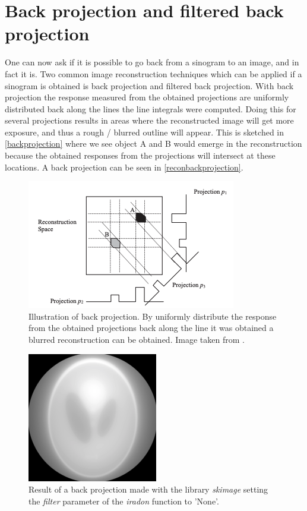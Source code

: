 \section{Back projection and filtered back projection}
One can now ask if it is possible to go back from a sinogram to an image, and in fact it is. Two common image reconstruction techniques which can be applied if a sinogram is obtained is back projection and filtered back projection. With back projection the response measured from the obtained projections are uniformly distributed back along the lines the line integrals were computed. Doing this for several projections results in areas where the reconstructed image will get more exposure, and thus a rough / blurred outline will appear. This is sketched in \autoref{backprojection} where we see object A and B would emerge in the reconstruction because the obtained responses from the projections will intersect at these locations. A back projection can be seen in \autoref{reconbackprojection}.\\
\begin{figure}
	\centering
	\includegraphics[width=0.9\linewidth]{Materials/backprojection}
	\caption{Illustration of back projection. By uniformly distribute the response from the obtained projections back along the line it was obtained a blurred reconstruction can be obtained. Image taken from \cite{MIA}.}
	\label{backprojection}
\end{figure}
\begin{figure}
	\centering
	\includegraphics[width=0.6\linewidth]{Materials/reconnofilter}
	\caption{Result of a back projection made with the library \textit{skimage} setting the \textit{filter} parameter of the \textit{iradon} function to 'None'.}
	\label{reconbackprojection}
\end{figure}

